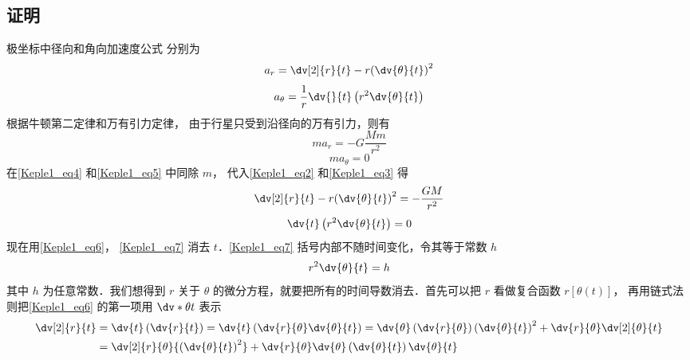 \subsection{证明}
极坐标中径向和角向加速度公式%
分别为
\begin{equation}\label{Keple1_eq2}
{a_r} = \dv[2]{r}{t} - r{\left( {\dv{\theta}{t}} \right)^2}
\end{equation}
\begin{equation}\label{Keple1_eq3}
a_\theta = \frac{1}{r}\dv{}{t}\left(r^2\dv{\theta}{t} \right)
\end{equation}
根据牛顿第二定律和万有引力定律，%
由于行星只受到沿径向的万有引力，则有
\begin{equation}\label{Keple1_eq4}
m{a_r} =  - G\frac{Mm}{r^2}
\end{equation}
\begin{equation}\label{Keple1_eq5}
m{a_\theta } = 0
\end{equation}
在\autoref{Keple1_eq4} 和\autoref{Keple1_eq5} 中同除 $m$，  代入\autoref{Keple1_eq2} 和\autoref{Keple1_eq3} 得
\begin{equation}\label{Keple1_eq6}
\dv[2]{r}{t} - r{\left( {\dv{\theta}{t}} \right)^2} =  - \frac{{GM}}{{{r^2}}}
\end{equation}
\begin{equation}\label{Keple1_eq7}
\dv{t}\left( {{r^2}\dv{\theta}{t}} \right) = 0
\end{equation}
现在用\autoref{Keple1_eq6}， \autoref{Keple1_eq7} 消去 $t$．\autoref{Keple1_eq7} 括号内部不随时间变化，令其等于常数 $h$
\begin{equation}\label{Keple1_eq8}
{r^2}\dv{\theta}{t} = h
\end{equation}
其中 $h$ 为任意常数．我们想得到 $r$ 关于 $\theta$ 的微分方程，就要把所有的时间导数消去．首先可以把 $r$ 看做复合函数 $r[\theta(t)]$， 再用链式法则把\autoref{Keple1_eq6} 的第一项用 $\dv*{\theta}{t}$ 表示
\begin{equation}\label{Keple1_eq10}
\begin{aligned}
\dv[2]{r}{t} & = \dv{t}\left(\dv{r}{t}\right) = \dv{t}\left( {\dv{r}{\theta} \dv{\theta}{t}} \right) = \dv{\theta}\left( {\dv{r}{\theta}} \right){\left( {\dv{\theta}{t}} \right)^2} + \dv{r}{\theta}\dv[2]{\theta}{t}\\
& = \dv[2]{r}{\theta}{\left( {\dv{\theta}{t}} \right)^2} + \dv{r}{\theta}\dv{\theta}\left( {\dv{\theta}{t}} \right)\dv{\theta}{t}
\end{aligned}
\end{equation}
